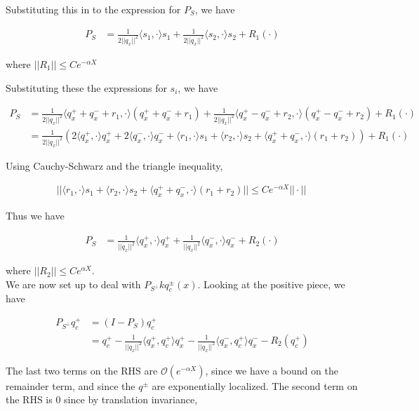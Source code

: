 \documentclass[12pt]{article}
\begin{document}
\begin{enumerate}
Substituting this in to the expression for $P_S$, we have

\begin{align*}
P_S &= \frac{1}{2 ||q_x||^2} \langle s_1, \cdot \rangle s_1 + \frac{1}{2 ||q_x||^2} \langle s_2, \cdot \rangle s_2 + R_1(\cdot)
\end{align*}

where $||R_1|| \leq C e^{-\alpha X} $


Substituting these the expressions for $s_i$, we have

\begin{align*}
P_S &= \frac{1}{2 ||q_x||^2}\langle q^+_x + q^-_x + r_1, \cdot \rangle(q^+_x + q^-_x + r_1) 
+ \frac{1}{2 ||q_x||^2} \langle q^+_x - q^-_x + r_2, \cdot \rangle (q^+_x - q^-_x + r_2) + R_1(\cdot)  \\
&= \frac{1}{2 ||q_x||^2} \left( 2 \langle q^+_x, \cdot \rangle q^+_x + 2 \langle q^-_x, \cdot \rangle q^-_x
+ \langle r_1, \cdot \rangle s_1 + \langle r_2, \cdot \rangle s_2
+ \langle q^+_x + q^-_x, \cdot \rangle (r_1 + r_2) \right) + R_1(\cdot)
\end{align*}

Using Cauchy-Schwarz and the triangle inequality,

\begin{align*}
|| \langle r_1, \cdot \rangle s_1 + \langle r_2, \cdot \rangle s_2
+ \langle q^+_x + q^-_x, \cdot \rangle (r_1 + r_2) || \leq C e^{-\alpha X} ||\cdot||
\
\end{align*}

Thus we have

\begin{align*}
P_S &= \frac{1}{||q_x||^2} \langle q^+_x, \cdot \rangle q^+_x + \frac{1}{||q_x||^2} \langle q^-_x, \cdot \rangle q^-_x + R_2(\cdot)
\end{align*}

where $||R_2|| \leq C e^{\alpha X}$. \\

We are now set up to deal with $P_{S^\perp} k q^\pm_c(x)$. Looking at the positive piece, we have

\begin{align*}
P_{S^\perp} q^+_c &= (I - P_S)q^+_c \\
&= q^+_c - \frac{1}{||q_x||^2} \langle q^+_x, q^+_c \rangle q^+_x - \frac{1}{||q_x||^2} \langle q^-_x, q^+_c \rangle q^-_x - R_2(q^+_c)
\end{align*}

The last two terms on the RHS are $\mathcal{O}(e^{-\alpha X})$, since we have a bound on the remainder term, and since the $q^\pm$ are exponentially localized. The second term on the RHS is 0 since by translation invariance, 


\end{enumerate}
\end{document}
